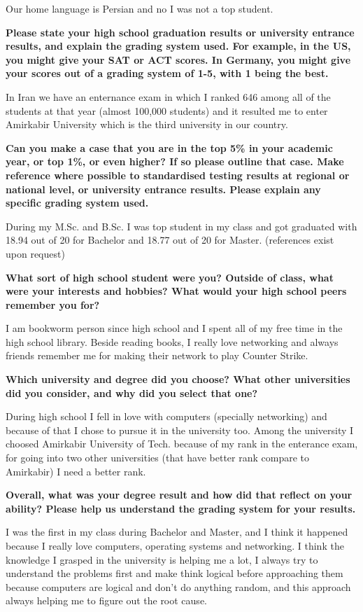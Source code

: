 Our home language is Persian and no I was not a top student.

\noindent
\textbf{Please state your high school graduation results or university entrance results, and explain the grading system used. For example, in the US, you might give your SAT or ACT scores.
In Germany, you might give your scores out of a grading system of 1-5, with 1 being the best.}

In Iran we have an enternance exam in which I ranked 646 among all of the students at that year (almost 100,000 students)
and it resulted me to enter Amirkabir University which is the third university in our country.

\noindent
\textbf{Can you make a case that you are in the top 5\% in your academic year, or top 1\%, or even higher?
If so please outline that case. Make reference where possible to standardised testing results at regional or national level, or university entrance results. Please explain any specific grading system used.}

During my M.Sc. and B.Sc. I was top student in my class and got graduated with 18.94 out of 20 for Bachelor and 18.77 out of 20 for Master.
(references exist upon request)

\noindent
\textbf{What sort of high school student were you? Outside of class, what were your interests and hobbies? What would your high school peers remember you for?}

I am bookworm person since high school and I spent all of my free time in the high school library.
Beside reading books, I really love networking and always friends remember me for making their network to play Counter Strike.

\noindent
\textbf{Which university and degree did you choose? What other universities did you consider, and why did you select that one?}

During high school I fell in love with computers (specially networking) and because of that I chose to pursue
it in the university too. Among the university I choosed Amirkabir University of Tech. because of my rank in the enterance exam,
for going into two other universities (that have better rank compare to Amirkabir) I need a better rank.

\noindent
\textbf{Overall, what was your degree result and how did that reflect on your ability? Please help us understand the grading system for your results.}

I was the first in my class during Bachelor and Master, and I think it happened because I really love computers,
operating systems and networking. I think the knowledge I grasped in the university is helping me a lot, I always
try to understand the problems first and make think logical before approaching them because computers are logical
and don't do anything random, and this approach always helping me to figure out the root cause.

